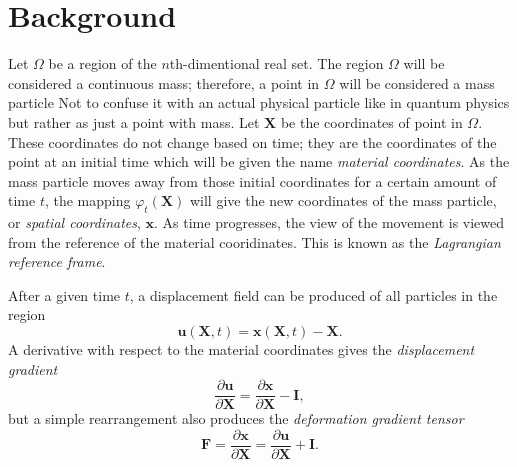 \section{Background}
Let $\Omega$ be a region of the $n$th-dimentional real set. The region $\Omega$ will be considered a continuous mass; therefore, a point in $\Omega$ will be considered a mass particle Not to confuse it with an actual physical particle like in quantum physics but rather as just a point with mass. Let $\mathbf{X}$ be the coordinates of point in $\Omega$. These coordinates do not change based on time; they are the coordinates of the point at an initial time which will be given the name \textit{material coordinates}. As the mass particle moves away from those initial coordinates for a certain amount of time $t$, the mapping $\varphi_t(\mathbf{X})$ will give the new coordinates of the mass particle, or \textit{spatial coordinates}, $\mathbf{x}$. As time progresses, the view of the movement is viewed from the reference of the material cooridinates. This is known as the \textit{Lagrangian reference frame}.

After a given time $t$, a displacement field can be produced of all particles in the region
\begin{equation}
  \mathbf{u}(\mathbf{X},t) = \mathbf{x}(\mathbf{X},t) - \mathbf{X}.
\end{equation}
A derivative with respect to the material coordinates gives the \textit{displacement gradient}
\begin{equation}
  \frac{\partial \mathbf{u}}{\partial \mathbf{X}} = \frac{\partial \mathbf{x}}{\partial \mathbf{X}} - \mathbf{I},
\end{equation}
but a simple rearrangement also produces the \textit{deformation gradient tensor}
\begin{equation}
  \mathbf{F} = \frac{\partial \mathbf{x}}{\partial \mathbf{X}} = \frac{\partial \mathbf{u}}{\partial \mathbf{X}} + \mathbf{I}.
\end{equation}
